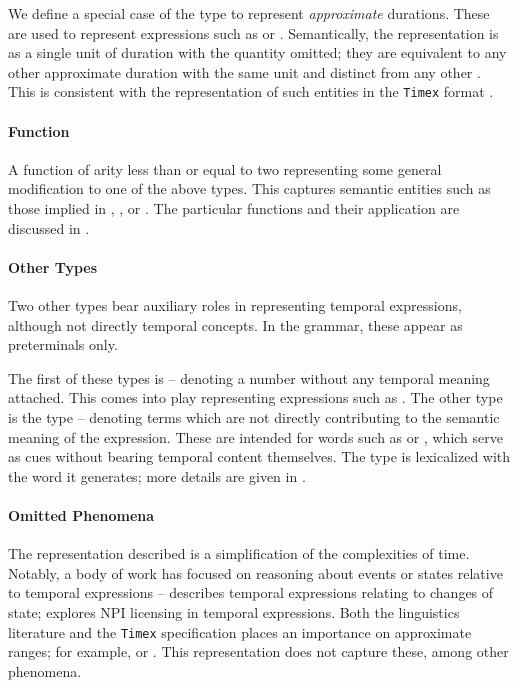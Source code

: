 We define a special case of the  type to represent 
	\textit{approximate} durations.
These are used to represent expressions such as  or
	.
Semantically, the representation is as a single unit of duration with the
	quantity omitted; they are equivalent to any other approximate
	duration with the same unit and distinct from any other .
This is consistent with the representation of such entities in the
	\texttt{Timex} format \cite{key:2003pustejovsky-timeml}.

\paragraph{Function}
A function of arity less than or equal to two representing some
	general modification to one of the above types.
This captures semantic entities such as those implied in
	, , or .
The particular functions and their application are discussed in 
	.


\paragraph{Other Types}
Two other types bear auxiliary roles in representing temporal expressions,
	although not directly temporal concepts.
In the grammar, these appear as preterminals only.

The first of these types is  -- denoting a number without
	any temporal meaning attached.
This comes into play representing expressions such as .
The other type is the  type -- denoting terms which are not
	directly contributing to the semantic meaning of the expression.
These are intended for words such as  or , which serve as cues
	without bearing temporal content themselves.
The  type is lexicalized with the word it generates; more details
	are given in .


\paragraph{Omitted Phenomena}
The representation described is a simplification of the complexities of
	time.
Notably, a body of work has focused on reasoning about events or states
	relative to temporal expressions -- 
	 describes temporal expressions relating to
	changes of state; 
	 explores NPI licensing in temporal
	expressions.
Both the linguistics literature and the \texttt{Timex} specification
	places an importance on approximate ranges;
	for example,  or .
This representation does not capture these, among other phenomena.

